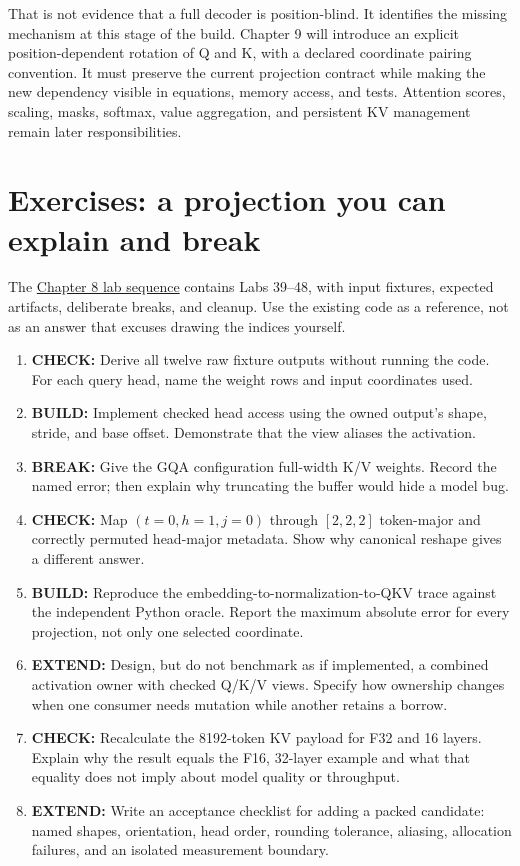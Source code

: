 That is not evidence that a full decoder is position-blind. It
identifies the missing mechanism at this stage of the build. Chapter 9
will introduce an explicit position-dependent rotation of Q and K, with
a declared coordinate pairing convention. It must preserve the current
projection contract while making the new dependency visible in
equations, memory access, and tests. Attention scores, scaling, masks,
softmax, value aggregation, and persistent KV management remain later
responsibilities.

\section{Exercises: a projection you can explain and
break}\label{exercises-a-projection-you-can-explain-and-break}

The
\href{https://github.com/hermonai/inside-the-llm-engine/blob/astra-visual-rewrite/labs/lab-39-qkv-projection-workbench.md}{Chapter
8 lab sequence} contains Labs 39--48, with input fixtures, expected
artifacts, deliberate breaks, and cleanup. Use the existing code as a
reference, not as an answer that excuses drawing the indices yourself.

\begin{enumerate}
\def\labelenumi{\arabic{enumi}.}
\tightlist
\item
  \textbf{CHECK:} Derive all twelve raw fixture outputs without running
  the code. For each query head, name the weight rows and input
  coordinates used.
\item
  \textbf{BUILD:} Implement checked head access using the owned output's
  shape, stride, and base offset. Demonstrate that the view aliases the
  activation.
\item
  \textbf{BREAK:} Give the GQA configuration full-width K/V weights.
  Record the named error; then explain why truncating the buffer would
  hide a model bug.
\item
  \textbf{CHECK:} Map \((t=0,h=1,j=0)\) through \([2,2,2]\) token-major
  and correctly permuted head-major metadata. Show why canonical reshape
  gives a different answer.
\item
  \textbf{BUILD:} Reproduce the embedding-to-normalization-to-QKV trace
  against the independent Python oracle. Report the maximum absolute
  error for every projection, not only one selected coordinate.
\item
  \textbf{EXTEND:} Design, but do not benchmark as if implemented, a
  combined activation owner with checked Q/K/V views. Specify how
  ownership changes when one consumer needs mutation while another
  retains a borrow.
\item
  \textbf{CHECK:} Recalculate the 8192-token KV payload for F32 and 16
  layers. Explain why the result equals the F16, 32-layer example and
  what that equality does not imply about model quality or throughput.
\item
  \textbf{EXTEND:} Write an acceptance checklist for adding a packed
  candidate: named shapes, orientation, head order, rounding tolerance,
  aliasing, allocation failures, and an isolated measurement boundary.
\end{enumerate}

